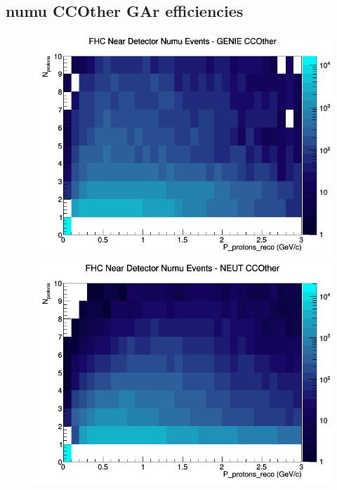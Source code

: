 \subsection{numu CCOther GAr efficiencies}
\begin{figure}[h]
\includegraphics[width=\linewidth]{eff_N_P/GAr/protons/CCOther_FHC_ND_numu_N_P_GENIE.png}
\endminipage
{}
\includegraphics[width=\linewidth]{eff_N_P/GAr/protons/CCOther_FHC_ND_numu_N_P_NEUT.png}
\endminipage
{}

\end{figure}
